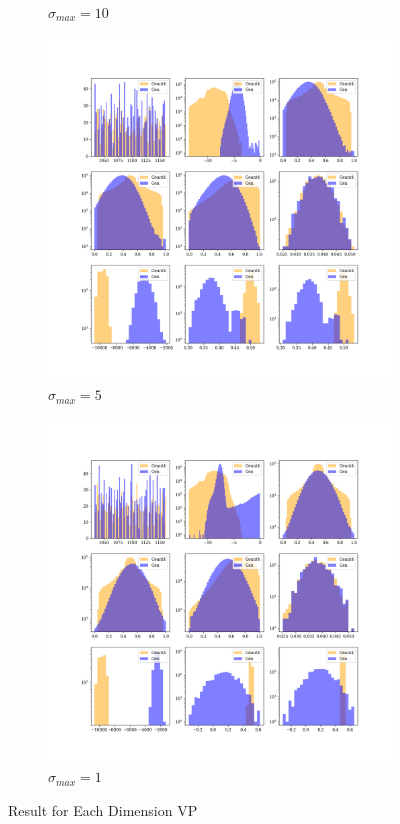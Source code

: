 \begin{figure}
\begin{subfigure}[b]{0.23\textwidth}
        \caption{$\sigma_{max}=10$}
        \label{fig:vp10_1}
    \end{subfigure}
    \hfill
    \begin{subfigure}[b]{0.23\textwidth}
        \centering
        \includegraphics[width=\textwidth]{Figures/vp5_1.png}
        \caption{$\sigma_{max}=5$}
        \label{fig:vp5_1}
    \end{subfigure}
    \hfill
    \begin{subfigure}[b]{0.23\textwidth}  %
        \centering
        \includegraphics[width=\textwidth]{Figures/vp1_1.png}
        \caption{$\sigma_{max}=1$}
        \label{fig:vp1_1}
    \end{subfigure}
    \caption{Result for Each Dimension VP}
\end{figure}

